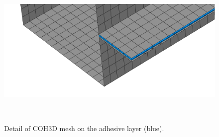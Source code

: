 \documentclass[cmfonts]{witpress}
\begin{document}
\begin{figure}[htpb]
	\centering
	\begin{minipage}[b]{.7\linewidth}
		\centering
		\includegraphics[width=0.7\linewidth]{figures/IMG_CUTRES/mesh_detail_coh3d_comparison}
		\caption[Detail of COH3D mesh on the adhesive layer.]{Detail of COH3D mesh on the adhesive layer (blue).}
		\label{fig:mesh_detail_coh3d_comparison}
	\end{minipage}
	\\[10pt]
	\begin{minipage}[b]{.7\linewidth}
		\centering

\end{minipage}
\end{figure}
\end{document}

